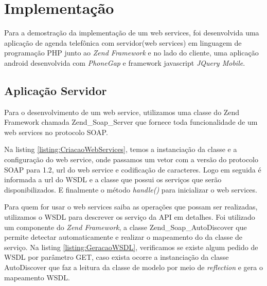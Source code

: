 \documentclass{acm_proc_article-sp}
\begin{document}
		
\section{Implementação}


	
	Para a demostração da implementação de um web services, foi desenvolvida uma aplicação de agenda telefônica com servidor(web services) em linguagem de programação PHP junto ao \emph{Zend Framework} e no lado do cliente, uma aplicação android desenvolvida com \emph{PhoneGap} e framework javascript \emph{JQuery Mobile}.
	
	\subsection{Aplicação Servidor}

	Para o desenvolvimento de um web service, utilizamos uma classe do Zend Framework chamada Zend\_Soap\_Server que fornece toda funcionalidade de um web services no protocolo SOAP. 
	
	Na listing \ref{listing:CriacaoWebServices}, temos a instanciação da classe e a configuração do web service, onde passamos um vetor com a versão do protocolo SOAP para 1.2, url do web service e codificação de caracteres. Logo em seguida é informada a url do WSDL e a classe que possui os serviços que serão disponibilizados. E finalmente o método \emph{handle()} para inicializar o web services.
	
	
	
	Para quem for usar o web services saiba as operações que possam ser realizadas, utilizamos o WSDL para descrever os serviço da API em detalhes. Foi utilizado um componente do \emph{Zend Framework}, a classe Zend\_Soap\_AutoDiscover que permite detectar automaticamente e realizar o mapeamento do da classe de serviço. Na listing \ref{listing:GeracaoWSDL}, verificamos se existe algum pedido de WSDL por parâmetro GET, caso exista ocorre a instanciação da classe AutoDiscover que faz a leitura da classe de modelo por meio de \emph{reflection} e gera o mapeamento WSDL.
	
\end{document}
